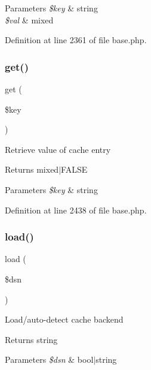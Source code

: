 \begin{DoxyParams}{Parameters}
{\em \$key} & string \\
\hline
{\em \$val} & mixed \\
\hline
\end{DoxyParams}


Definition at line 2361 of file base.\+php.

\hypertarget{class_cache_a24a9bf83a1002d46ece83a93d14bd921}{}\label{class_cache_a24a9bf83a1002d46ece83a93d14bd921} 
\subsubsection{\texorpdfstring{get()}{get()}}
{\footnotesize\ttfamily get (\begin{DoxyParamCaption}\item[{}]{\$key }\end{DoxyParamCaption})}

Retrieve value of cache entry \begin{DoxyReturn}{Returns}
mixed$\vert$\+F\+A\+L\+SE 
\end{DoxyReturn}

\begin{DoxyParams}{Parameters}
{\em \$key} & string \\
\hline
\end{DoxyParams}


Definition at line 2438 of file base.\+php.

\hypertarget{class_cache_a0c573a775b081079b350498980565fa2}{}\label{class_cache_a0c573a775b081079b350498980565fa2} 
\subsubsection{\texorpdfstring{load()}{load()}}
{\footnotesize\ttfamily load (\begin{DoxyParamCaption}\item[{}]{\$dsn }\end{DoxyParamCaption})}

Load/auto-\/detect cache backend \begin{DoxyReturn}{Returns}
string 
\end{DoxyReturn}

\begin{DoxyParams}{Parameters}
{\em \$dsn} & bool$\vert$string \\
\hline
\end{DoxyParams}


